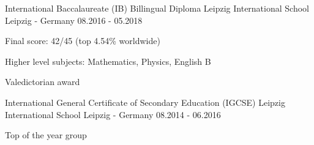 \begin{cventries}
    \cventry
    {International Baccalaureate (IB) Billingual Diploma}
    {Leipzig International School}
    {Leipzig - Germany}
    {08.2016 - 05.2018}
    {
      \begin{cvitems}
        \item Final score: 42/45 (top 4.54\% worldwide)
        \item Higher level subjects: Mathematics, Physics, English B
        \item Valedictorian award
      \end{cvitems}
    }
    
       \cventry
    {International General Certificate of Secondary Education (IGCSE)}
    {Leipzig International School}
    {Leipzig - Germany}
    {08.2014 - 06.2016}
    {
      \begin{cvitems}
        \item {Top of the year group}
      \end{cvitems}
    }

\end{cventries}